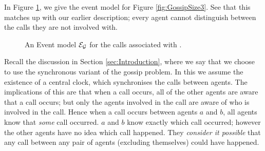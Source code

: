 \documentclass[10pt, a4paper]{report}
\begin{document}
In Figure \ref{fig:GossipEvMo}, we give the event model for Figure
\ref{fig:GossipSize3}. See that this matches up with our earlier description;
every agent cannot distinguish between the calls they are not involved with.

\begin{figure}[h]
  \centering
  \caption{An Event model $\mathcal{E_G}$ for the calls associated with .}
  \label{fig:GossipEvMo}
\end{figure}


Recall the discussion in Section \ref{sec:Introduction}, where we say that we
choose to use the synchronous variant of the gossip problem. In this we assume
the existence of a central clock, which synchronises the calls between agents.
The implications of this are that when a call occurs, all of the other agents
are aware that a call occurs; but only the agents involved in the call are aware
of who is involved in the call. Hence when a call occurs between agents $a$ and
$b$, all agents know that \emph{some} call occurred. $a$ and $b$ know exactly
which call occurred; however the other agents have no idea which call happened.
They \emph{consider it possible} that any call between any pair of agents
(excluding themselves) could have happened.
\end{document}
